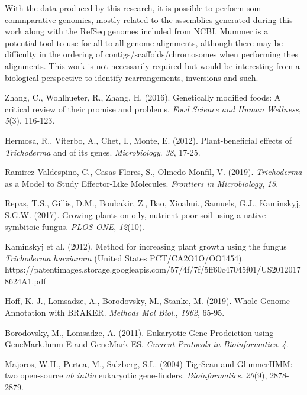 \documentclass[12pt]{article}
\begin{document}
With the data produced by this research, it is possible to perform som
commparative genomics, mostly related to the assemblies generated
during this work along with the RefSeq genomes included from
NCBI. Mummer is a potential tool to use for all to all genome
alignments, although there may be difficulty in the ordering of
contigs/scaffolds/chromosomes when performing thes alignments. This
work is not necessarily required but would be interesting from a
biological perspective to identify rearrangements, inversions and
such.

\begin{thebibliography}{99}
 Zhang, C., Wohlhueter, R., Zhang, H. (2016). Genetically
  modified foods: A critical review of their promise and
  problems. \textit{Food Science and Human Wellness}, \textit{5}(3),
  116-123.

 Hermosa, R., Viterbo, A., Chet, I., Monte,
  E. (2012). Plant-beneficial effects of \textit{Trichoderma} and of
  its genes. \textit{Microbiology}. \textit{38},
  17-25. 

 Ramirez-Valdespino, C., Casas-Flores, S.,
  Olmedo-Monfil, V. (2019). \textit{Trichoderma} as a Model to Study
  Effector-Like Molecules. \textit{Frontiers in Microbiology}, \textit{15}.

 Repas, T.S., Gillis, D.M., Boubakir, Z., Bao,
  Xioahui., Samuels, G.J., Kaminskyj, S.G.W. (2017). Growing plants on
  oily, nutrient-poor soil using a native symbitoic
  fungus. \textit{PLOS ONE}, \textit{12}(10).

 Kaminskyj et al. (2012). Method for increasing
  plant growth using the fungus \textit{Trichoderma harzianum} (United
  States PCT/CA2O1O/OO1454). https://patentimages.storage.googleapis.com/57/4f/7f/5ff60c47045f01/US20120178624A1.pdf
  
 Hoff, K. J., Lomsadze, A., Borodovsky, M., Stanke,
  M. (2019). Whole-Genome Annotation with BRAKER. \textit{Methods Mol
    Biol.}, \textit{1962}, 65-95.

 Borodovsky, M., Lomsadze, A. (2011). Eukaryotic
  Gene Prodeiction using GeneMark.hmm-E and
  GeneMark-ES. \textit{Current Protocols in
    Bioinformatics}. \textit{4}.

 Majoros, W.H., Pertea, M., Salzberg, S.L. (2004) TigrScan and
  GlimmerHMM: two open-source \textit{ab initio} eukaryotic
  gene-finders. \textit{Bioinformatics}. \textit{20}(9), 2878-2879.
  

\end{thebibliography}
\end{document}
